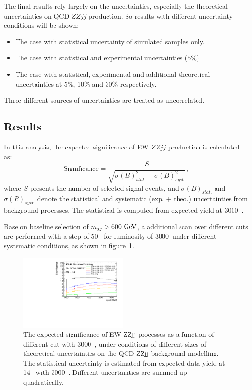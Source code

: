 The final results rely largely on the uncertainties, especially the theoretical uncertainties on QCD-$ZZjj$ production.
So results with different uncertainty conditions will be shown:
\begin{itemize}
	\item The case with statistical uncertainty of simulated samples only.
	\item The case with statistical and experimental uncertainties (5\%)
	\item The case with statistical, experimental and additional theoretical uncertainties at 5\%, 10\% and 30\% respectively.
\end{itemize}
Three different sources of uncertainties are treated as uncorrelated.

\subsection{Results}

In this analysis, the expected significance of EW-$ZZjj$ production is calculated as:
\begin{equation}
  \text{Significance} = \frac{S}{\sqrt{\sigma(B)_{stat.}^2 + \sigma(B)_{syst.}^2}},
\end{equation}
where $S$ presents the number of selected signal events,
and $\sigma(B)_{stat.}$ and $\sigma(B)_{syst.}$ denote the statistical and systematic (exp. + theo.) uncertainties from background processes.
The statistical is computed from expected yield at 3000~\ifb.

Base on baseline selection of $m_{jj} > 600~\text{Ge\kern -0.1em V}$, a additional scan over different \mjj cuts are performed with a step of 50~\gev
for luminosity of 3000~\ifb under different systematic conditions, as shown in figure~\ref{fig:mjj_scan}.
\begin{figure}[!htbp]
\centering
\includegraphics[width=0.48\textwidth]{figures/VBSZZ/hllhc/significance_noshape_0_noratio.pdf}
\caption{
The expected significance of EW-ZZjj processes as a function of different \mjj cut with 3000~\ifb,
under conditions of different sizes of theoretical uncertainties on the QCD-ZZjj background modelling.
The statistical uncertainty is estimated from expected data yield at 14~\TeV{} with 3000~\ifb.
Different uncertainties are summed up quadratically.
}
\label{fig:mjj_scan}
\end{figure}


